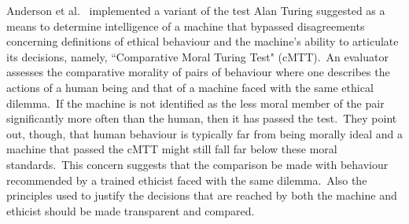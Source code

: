  Anderson et al.\ \cite{Anderson_Anderson_2007} implemented a variant of the test Alan Turing \cite{10.2307/2251299} suggested as a means to determine intelligence of a machine that bypassed disagreements concerning definitions of ethical behaviour and the machine's ability to articulate its decisions, namely, ``Comparative Moral Turing Test" (cMTT).\ An evaluator assesses the comparative morality of pairs of behaviour where one describes the actions of a human being and that of a machine faced with the same ethical dilemma.\ If the machine is not identified as the less moral member of the pair significantly more often than the human, then it has passed the test.\ They point out, though, that human behaviour is typically far from being morally ideal and a machine that passed the cMTT might still fall far below these moral standards.\ This concern suggests that the comparison be made with behaviour recommended by a trained ethicist faced with the same dilemma.\ Also the principles used to justify the decisions that are reached by both the machine and ethicist should be made transparent and compared.